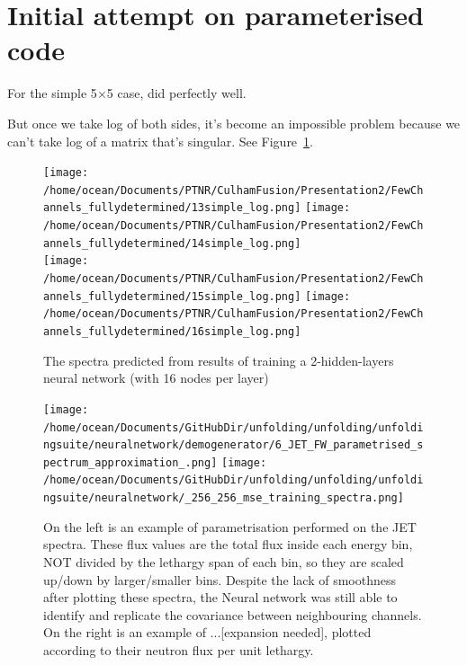 \documentclass[a4paper, 12pt]{article}
\begin{document}
\section{Initial attempt on parameterised code}
For the simple 5$\times$5 case, did perfectly well.

But once we take log of both sides, it's become an impossible problem because we can't take log of a matrix that's singular. See Figure~\ref{5x5}.

\begin{figure}
\centering
\texttt{[image: /home/ocean/Documents/PTNR/CulhamFusion/Presentation2/FewChannels\_fullydetermined/13simple\_log.png]}
\texttt{[image: /home/ocean/Documents/PTNR/CulhamFusion/Presentation2/FewChannels\_fullydetermined/14simple\_log.png]}\\
\texttt{[image: /home/ocean/Documents/PTNR/CulhamFusion/Presentation2/FewChannels\_fullydetermined/15simple\_log.png]}
\texttt{[image: /home/ocean/Documents/PTNR/CulhamFusion/Presentation2/FewChannels\_fullydetermined/16simple\_log.png]}
\caption{The spectra predicted from results of training a 2-hidden-layers neural network (with 16 nodes per layer) } \label{5x5}
\end{figure}


\begin{figure}
\centering
\texttt{[image: /home/ocean/Documents/GitHubDir/unfolding/unfolding/unfoldingsuite/neuralnetwork/demogenerator/6\_JET\_FW\_parametrised\_spectrum\_approximation\_.png]}
\texttt{[image: /home/ocean/Documents/GitHubDir/unfolding/unfolding/unfoldingsuite/neuralnetwork/\_256\_256\_mse\_training\_spectra.png]}
\caption{On the left is an example of parametrisation performed on the JET spectra. These flux values are the total flux inside each energy bin, NOT divided by the lethargy span of each bin, so they are scaled up/down by larger/smaller bins. Despite the lack of smoothness after plotting these spectra, the Neural network was still able to identify and replicate the covariance between neighbouring channels.\\
On the right is an example of ...[expansion needed], plotted according to their neutron flux per unit lethargy.}\label{Parametrisation}
\end{figure}
\end{document}
